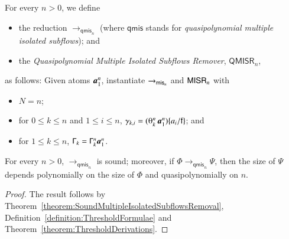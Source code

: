 \newcommand{\frqmis}{{\mathsf{qmis}}}
\newcommand{\QMISR}{\mathsf{QMISR}}
\begin{definition}\label{definition:QuasipolynomialMultipleSubflowRemoval}
For every $n>0$, we define
\begin{itemize}
\item the reduction $\to_{\frqmis_n}$ (where $\frqmis$ stands for \emph{quasipolynomial multiple isolated subflows}); and
\item the \emph{Quasipolynomial Multiple Isolated Subflows Remover}, $\QMISR_n$,
\end{itemize}
as follows: Given atoms ${\boldsymbol a}_{1}^{n}$, instantiate $\to_{{\mathsf{mis}}_n}$ and $\mathsf{MISR}_n$ with
\begin{itemize}
\item $N=n$;
\item for $0\le k\le n$ and $1\le i\le n$, $\gamma_{k,i}=(\th kn\avec1n)\{a_i/\fff\}$; and
\item for $1\le k\le n$, $\mathsf\Gamma_k=\mathsf\Gamma^n_k{\boldsymbol a}_{1}^{n}$.
\end{itemize}
\end{definition}

\begin{theorem}\label{theorem:SoundQuasipolynomialMultipleSubflowsRemoval}
For every $n>0$, $\to_{\frqmis_n}$ is sound; moreover, if\/ $\Phi\to_{\frqmis_n}\Psi$, then the size of $\Psi$ depends polynomially on the size of $\Phi$ and quasipolynomially on $n$.
\end{theorem}

\begin{proof}
The result follows by Theorem~\vref{theorem:SoundMultipleIsolatedSubflowsRemoval}, Definition~\vref{definition:ThresholdFormulae} and Theorem~\ref{theorem:ThresholdDerivations}.
\end{proof}

